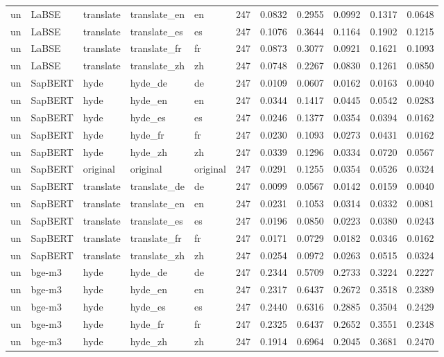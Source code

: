 \begin{tabular}{lllllrrrrrr}
un & LaBSE & translate & translate\_en & en & 247 & 0.0832 & 0.2955 & 0.0992 & 0.1317 & 0.0648 \\
un & LaBSE & translate & translate\_es & es & 247 & 0.1076 & 0.3644 & 0.1164 & 0.1902 & 0.1215 \\
un & LaBSE & translate & translate\_fr & fr & 247 & 0.0873 & 0.3077 & 0.0921 & 0.1621 & 0.1093 \\
un & LaBSE & translate & translate\_zh & zh & 247 & 0.0748 & 0.2267 & 0.0830 & 0.1261 & 0.0850 \\
un & SapBERT & hyde & hyde\_de & de & 247 & 0.0109 & 0.0607 & 0.0162 & 0.0163 & 0.0040 \\
un & SapBERT & hyde & hyde\_en & en & 247 & 0.0344 & 0.1417 & 0.0445 & 0.0542 & 0.0283 \\
un & SapBERT & hyde & hyde\_es & es & 247 & 0.0246 & 0.1377 & 0.0354 & 0.0394 & 0.0162 \\
un & SapBERT & hyde & hyde\_fr & fr & 247 & 0.0230 & 0.1093 & 0.0273 & 0.0431 & 0.0162 \\
un & SapBERT & hyde & hyde\_zh & zh & 247 & 0.0339 & 0.1296 & 0.0334 & 0.0720 & 0.0567 \\
un & SapBERT & original & original & original & 247 & 0.0291 & 0.1255 & 0.0354 & 0.0526 & 0.0324 \\
un & SapBERT & translate & translate\_de & de & 247 & 0.0099 & 0.0567 & 0.0142 & 0.0159 & 0.0040 \\
un & SapBERT & translate & translate\_en & en & 247 & 0.0231 & 0.1053 & 0.0314 & 0.0332 & 0.0081 \\
un & SapBERT & translate & translate\_es & es & 247 & 0.0196 & 0.0850 & 0.0223 & 0.0380 & 0.0243 \\
un & SapBERT & translate & translate\_fr & fr & 247 & 0.0171 & 0.0729 & 0.0182 & 0.0346 & 0.0162 \\
un & SapBERT & translate & translate\_zh & zh & 247 & 0.0254 & 0.0972 & 0.0263 & 0.0515 & 0.0324 \\
un & bge-m3 & hyde & hyde\_de & de & 247 & 0.2344 & 0.5709 & 0.2733 & 0.3224 & 0.2227 \\
un & bge-m3 & hyde & hyde\_en & en & 247 & 0.2317 & 0.6437 & 0.2672 & 0.3518 & 0.2389 \\
un & bge-m3 & hyde & hyde\_es & es & 247 & 0.2440 & 0.6316 & 0.2885 & 0.3504 & 0.2429 \\
un & bge-m3 & hyde & hyde\_fr & fr & 247 & 0.2325 & 0.6437 & 0.2652 & 0.3551 & 0.2348 \\
un & bge-m3 & hyde & hyde\_zh & zh & 247 & 0.1914 & 0.6964 & 0.2045 & 0.3681 & 0.2470 \\

\end{tabular}
